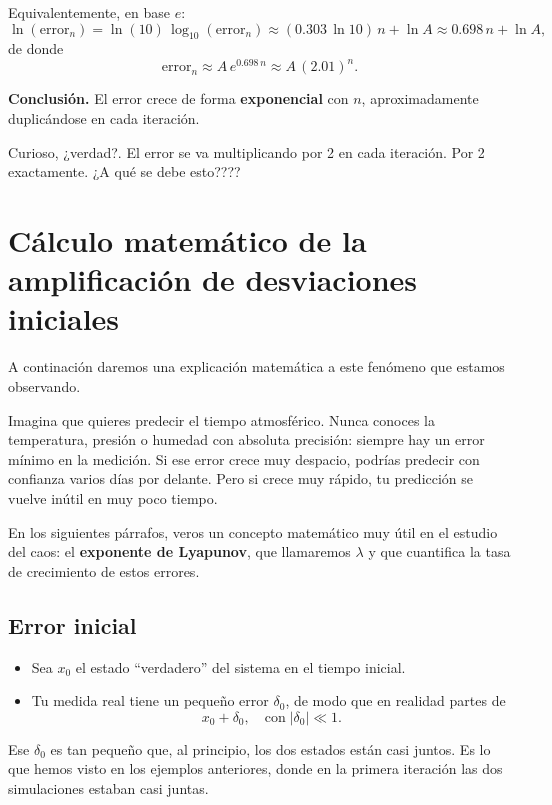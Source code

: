 \documentclass[
  10pt,
  a4paper,
  DIV=11,
  numbers=noendperiod,
  open=any]{scrreprt}
\providecommand{\tightlist}{%
  \setlength{\itemsep}{0pt}\setlength{\parskip}{0pt}}
\numberwithin{equation}{chapter}
\numberwithin{equation}{chapter}
\renewcommand{\[}{\begin{equation}}
\renewcommand{\]}{\end{equation}}
\begin{document}
Equivalentemente, en base \(e\): \[
\ln(\mathrm{error}_n)
= \ln(10)\,\log_{10}(\mathrm{error}_n)
\approx (0.303\,\ln 10)\,n + \ln A
\approx 0.698\,n + \ln A,
\] de donde \[
\mathrm{error}_n \approx A\,e^{0.698\,n}\approx A\,(2.01)^n.
\]

\textbf{Conclusión.} El error crece de forma \textbf{exponencial} con
\(n\), aproximadamente duplicándose en cada iteración.

Curioso, ¿verdad?. El error se va multiplicando por 2 en cada iteración.
Por 2 exactamente. ¿A qué se debe esto????

\section{Cálculo matemático de la amplificación de desviaciones
iniciales}\label{cuxe1lculo-matemuxe1tico-de-la-amplificaciuxf3n-de-desviaciones-iniciales}

A continación daremos una explicación matemática a este fenómeno que
estamos observando.

Imagina que quieres predecir el tiempo atmosférico. Nunca conoces la
temperatura, presión o humedad con absoluta precisión: siempre hay un
error mínimo en la medición. Si ese error crece muy despacio, podrías
predecir con confianza varios días por delante. Pero si crece muy
rápido, tu predicción se vuelve inútil en muy poco tiempo.

En los siguientes párrafos, veros un concepto matemático muy útil en el
estudio del caos: el \textbf{exponente de Lyapunov}, que llamaremos
\(\lambda\) y que cuantifica la tasa de crecimiento de estos errores.

\subsection{Error inicial}\label{error-inicial}

\begin{itemize}
\tightlist
\item
  Sea \(x_0\) el estado ``verdadero'' del sistema en el tiempo
  inicial.\\
\item
  Tu medida real tiene un pequeño error \(\delta_0\), de modo que en
  realidad partes de\\
  \[
     x_0 + \delta_0,
     \quad\text{con}\;|\delta_0|\ll 1.
   \]
\end{itemize}

Ese \(\delta_0\) es tan pequeño que, al principio, los dos estados están
casi juntos. Es lo que hemos visto en los ejemplos anteriores, donde en
la primera iteración las dos simulaciones estaban casi juntas.
\end{document}
